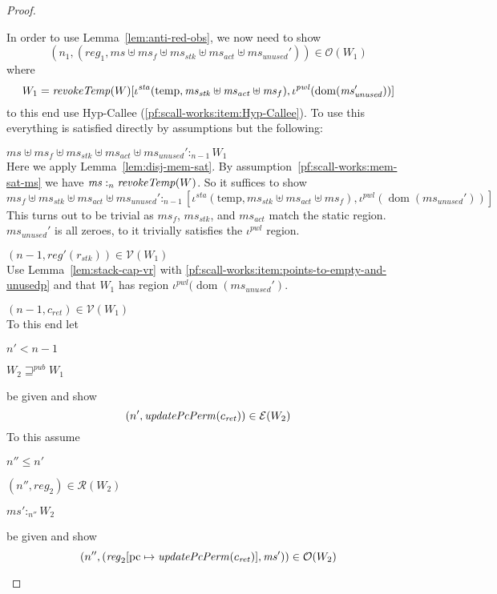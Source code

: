 \documentclass[a4paper]{article}
\newcommand{\update}[2]{[#1 \mapsto #2]}
\DeclareMathOperator{\dom}{dom}
\newcommand{\var}[1]{\mathit{#1}}
\newcommand{\hs}{\var{ms}}
\newcommand{\ms}{\hs}
\newcommand{\pcreg}{\mathrm{pc}}
\newcommand{\reg}{\var{reg}}
\newcommand{\heap}{\var{mem}}
\newcommand{\stk}{\var{stk}}
\newcommand{\pwl}{\var{pwl}}
\newcommand{\sta}{\var{sta}}
\newcommand{\unused}{\var{unused}}
\newcommand{\plainfun}[2]{
  \ifthenelse{\equal{#2}{}}
  {\mathit{#1}}
  {\mathit{#1}(#2)}
}
\newcommand{\updatePcPerm}[1]{\plainfun{updatePcPerm}{#1}}
\newcommand{\revokeTemp}[1]{\plainfun{revokeTemp}{#1}}
\newcommand{\futurewk}{\mathbin{\sqsupseteq}^{\var{pub}}}
\newcommand{\heapSat}[3][\heap]{#1 :_{#2} #3}
\newcommand{\memSat}[3][n]{\heapSat[#2]{#1}{#3}}
\newcommand{\asmType}{\plaindom{AsmType}}
\newcommand{\plaindom}[1]{\mathrm{#1}}
\newcommand{\intr}[2]{\mathcal{#1}}
\newcommand{\valueintr}[1]{\intr{V}{#1}}
\newcommand{\exprintr}[1]{\intr{E}{#1}}
\newcommand{\regintr}[1]{\intr{R}{#1}}
\newcommand{\stdvr}{\valueintr{\asmType}}
\newcommand{\stder}{\exprintr{\asmType}}
\newcommand{\stdrr}{\regintr{\asmType}}
\newcommand{\observations}{\mathcal{O}}
\newcommand{\npair}[2][n]{\left(#1,#2 \right)}
\newcommand{\plainview}[1]{\mathrm{#1}}
\newcommand{\temp}{\plainview{temp}}
\begin{document}
\begin{proof}
\begin{enumproof}[resume]
  \end{enumproof}
  In order to use Lemma~\ref{lem:anti-red-obs}, we now need to show
  \[
    \npair[n_1]{(\reg_1,\ms \uplus \ms_f \uplus \ms_\stk \uplus \ms_{\var{act}} \uplus \ms_\unused')} \in \observations(W_1)
  \]
  where
  \[
    W_1 = \revokeTemp{W}[\iota^{\sta}(\temp,\ms_\stk\uplus\ms_{\mathit{act}} \uplus \ms_f),\iota^{\pwl}(\dom(\ms_{\mathit{unused}}'))]
  \]
  to this end use Hyp-Callee (\ref{pf:scall-works:item:Hyp-Callee}). To use this everything is satisfied directly by assumptions but the following:
  \begin{enumproof}[resume]
    \item $\memSat[n-1]{\ms \uplus \ms_f \uplus \ms_\stk \uplus \ms_{\var{act}} \uplus \ms_\unused'}{W_1}$\\
      Here we apply Lemma~\ref{lem:disj-mem-sat}. By assumption~\ref{pf:scall-works:mem-sat-ms} we have $\memSat[n]{\ms}{\revokeTemp{W}}$. So it suffices to show
      \[
        \memSat[n-1]{\ms_f \uplus \ms_\stk \uplus \ms_{\var{act}} \uplus \ms_\unused'}{[\iota^{\sta}(\temp,\ms_\stk\uplus\ms_{\mathit{act}} \uplus \ms_f),\iota^{\pwl}(\dom(\ms_{\mathit{unused}}'))]}
      \]
      This turns out to be trivial as $\ms_f$, $\ms_\stk$, and $\ms_{\var{act}}$ match the static region. $\ms_\unused'$ is all zeroes, to it trivially satisfies the $\iota^\pwl$ region.
    \item $\npair[n-1]{\reg'(r_\stk)} \in \stdvr(W_1)$ \\
      Use Lemma~\ref{lem:stack-cap-vr} with \ref{pf:scall-works:item:points-to-empty-and-unusedp} and that $W_1$ has region $\iota^{\pwl}(\dom(\ms_{\mathit{unused}}')$.
    \item $\npair[n-1]{c_{\var{ret}}} \in \stdvr(W_1)$ \\
      To this end let 
      \begin{enumproof}
        \item $n' < n-1$ \label{pf:scall-works:np-n1}
        \item $W_2 \futurewk W_1$ \label{pf:scall-works:w2-futurewk-w1}
      \end{enumproof}
      be given and show
      \[
        \npair[n']{\updatePcPerm{c_{\var{ret}}}} \in \stder(W_2)
      \]
      To this assume 
      \begin{enumproof}[resume]
        \item $n'' \leq n'$
        \item $\npair[n'']{\reg_2} \in \stdrr(W_2)$ \label{pf:scall-worsk:reg2-reg-rel}
        \item $\memSat[n'']{\ms'}{W_2}$ \label{pf:scall-works:w2-memsat}
      \end{enumproof}
      be given and show
      \begin{equation}
        \label{pf:scall-works:obsw2}
        \npair[n'']{(\reg_2\update{\pcreg}{\updatePcPerm{c_{\var{ret}}}},\ms')} \in \observations(W_2)
      \end{equation}


\end{enumproof}
\end{proof}
\end{document}
